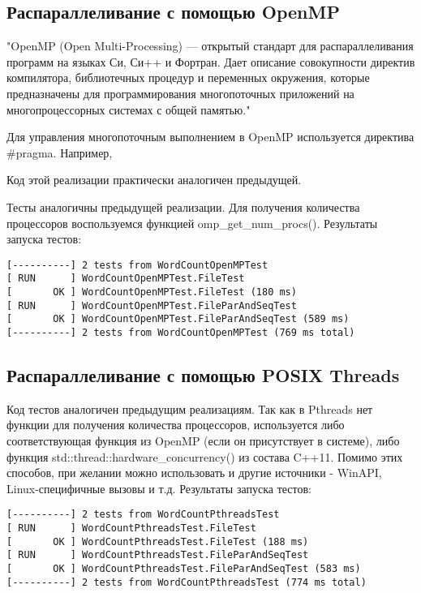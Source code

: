 \subsection{Распараллеливание с помощью OpenMP}

"OpenMP (Open Multi-Processing) — открытый стандарт для распараллеливания программ на языках Си, Си++ и Фортран. Дает описание совокупности директив компилятора, библиотечных процедур и переменных окружения, которые предназначены для программирования многопоточных приложений на многопроцессорных системах с общей памятью."

Для управления многопоточным выполнением в OpenMP используется директива \#pragma. Например, 

Код этой реализации практически аналогичен предыдущей.

% 

Тесты аналогичны предыдущей реализации. Для получения количества процессоров воспользуемся функцией omp\_get\_num\_procs(). Результаты запуска тестов:
\begin{lstlisting}
[----------] 2 tests from WordCountOpenMPTest
[ RUN      ] WordCountOpenMPTest.FileTest
[       OK ] WordCountOpenMPTest.FileTest (180 ms)
[ RUN      ] WordCountOpenMPTest.FileParAndSeqTest
[       OK ] WordCountOpenMPTest.FileParAndSeqTest (589 ms)
[----------] 2 tests from WordCountOpenMPTest (769 ms total)
\end{lstlisting}

\subsection{Распараллеливание с помощью POSIX Threads}

% 

Код тестов аналогичен предыдущим реализациям. Так как в Pthreads нет функции для получения количества процессоров, используется либо соответствующая функция из OpenMP (если он присутствует в системе), либо функция std::thread::hardware\_concurrency() из состава C++11. Помимо этих способов, при желании можно использовать и другие источники - WinAPI, Linux-специфичные вызовы и т.д. Результаты запуска тестов:
\begin{lstlisting}
[----------] 2 tests from WordCountPthreadsTest
[ RUN      ] WordCountPthreadsTest.FileTest
[       OK ] WordCountPthreadsTest.FileTest (188 ms)
[ RUN      ] WordCountPthreadsTest.FileParAndSeqTest
[       OK ] WordCountPthreadsTest.FileParAndSeqTest (583 ms)
[----------] 2 tests from WordCountPthreadsTest (774 ms total)
\end{lstlisting}

